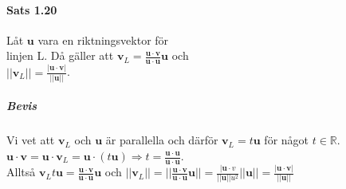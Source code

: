 \paragraph{Sats 1.20} Låt $\bm{u}$ vara en riktningsvektor för \\linjen L.
Då gäller att $\bm{v}_{L} = \frac{\bm{u}\cdot \bm{v}}{\bm{u}\cdot \bm{u}}\bm{u}$ och \\$||\bm{v}_{L}||=\frac{|\bm{u}\cdot \bm{v}|}{||\bm{u}||}$.
    \\
    \subparagraph{Bevis} Vi vet att $\bm{v}_{L}$ och $\bm{u}$ är parallella och därför $\bm{v}_{L}=t\bm{u}$ för något $t\in \mathbb{R}$.
$\bm{u}\cdot \bm{v}=\bm{u}\cdot \bm{v}_{L}=\bm{u}\cdot (t\bm{u}) \Rightarrow t=\frac{\bm{u}\cdot \bm{u}}{\bm{u}\cdot \bm{u}}$.
    \\Alltså
$\bm{v}_{L}t\bm{u}=\frac{\bm{u}\cdot \bm{v}}{\bm{u}\cdot \bm{u}}\bm{u}$ och
$||\bm{v}_{L}||=||\frac{\bm{u}\cdot \bm{v}}{\bm{u}\cdot \bm{u}}\bm{u}||=\frac{|\bm{u}\cdot v}{||\bm{u}||u^{2}}||\bm{u}||=\frac{|\bm{u}\cdot \bm{v}|}{||\bm{u}||}$

